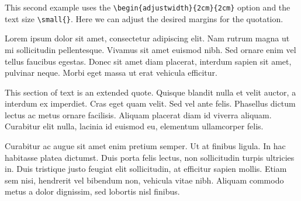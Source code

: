 \newpage

This second example uses the \verb|\begin{adjustwidth}{2cm}{2cm}| option and the text size \verb|\small{}|. Here we can adjust the desired margins for the quotation. 

\vspace{0.4cm}

Lorem ipsum dolor sit amet, consectetur adipiscing elit. Nam rutrum magna ut mi sollicitudin pellentesque. Vivamus sit amet euismod nibh. Sed ornare enim vel tellus faucibus egestas. Donec sit amet diam placerat, interdum sapien sit amet, pulvinar neque. Morbi eget massa ut erat vehicula efficitur. 

\begin{adjustwidth}{2cm}{2cm}

\small{This section of text is an extended quote. Quisque blandit nulla et velit auctor, a interdum ex imperdiet. Cras eget quam velit. Sed vel ante felis. Phasellus dictum lectus ac metus ornare facilisis. Aliquam placerat diam id viverra aliquam. Curabitur elit nulla, lacinia id euismod eu, elementum ullamcorper felis.} \parencite[][p. 100]{sennett1998corrosion}

\end{adjustwidth}

Curabitur ac augue sit amet enim pretium semper. Ut at finibus ligula. In hac habitasse platea dictumst. Duis porta felis lectus, non sollicitudin turpis ultricies in. Duis tristique justo feugiat elit sollicitudin, at efficitur sapien mollis. Etiam sem nisi, hendrerit vel bibendum non, vehicula vitae nibh. Aliquam commodo metus a dolor dignissim, sed lobortis nisl finibus. 
